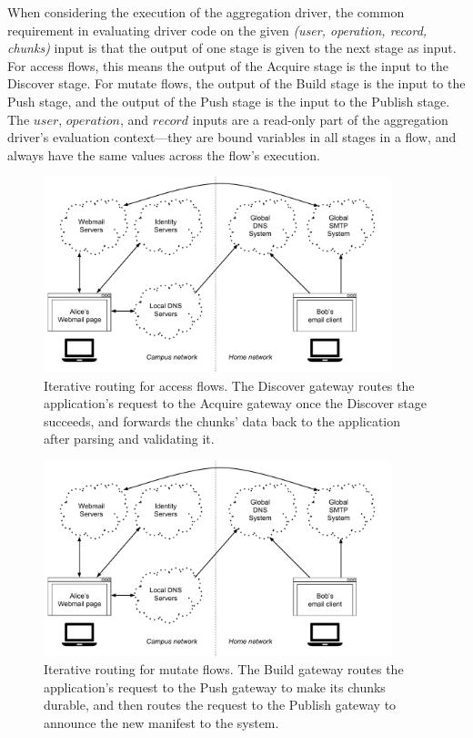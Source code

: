 When considering the execution of the aggregation driver, the common requirement in evaluating
driver code on the given \textit{(user, operation, record, chunks)} input is
that the output of one stage is given to the next stage as input.  For access
flows, this means the output of the Acquire stage is the input to the Discover
stage.  For mutate flows, the output of the Build stage is the input to the Push
stage, and the output of the Push stage is the input to the Publish stage.  The
$user$, $operation$, and $record$ inputs are a read-only part of the aggregation driver's
evaluation context---they are bound variables in all stages in a flow, and
always have the same values across the flow's execution.

\begin{figure}[h!]
   \centering
   \includegraphics[width=0.9\textwidth,page=9]{figures/dissertation-figures}
   \caption{Iterative routing for access flows.  The Discover gateway routes the
   application's request to the Acquire gateway once the Discover stage
   succeeds, and forwards the chunks' data back to the application after parsing
   and validating it.}
   \label{fig:chap2-access-flow-protocol}
\end{figure}

\begin{figure}[h!]
   \centering
   \includegraphics[width=0.9\textwidth,page=10]{figures/dissertation-figures}
   \caption{Iterative routing for mutate flows.  The Build gateway routes the
   application's request to the Push gateway to make its chunks durable, and
   then routes the request to the Publish gateway to announce the new manifest
   to the system.}
   \label{fig:chap2-mutate-flow-protocol}
\end{figure}


